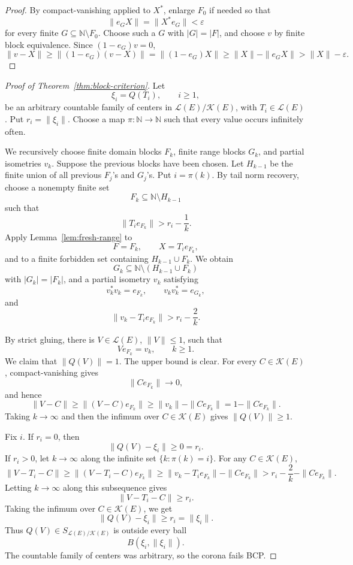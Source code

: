 \documentclass[11pt]{article}
\newcommand{\Lcal}{\mathcal L}
\newcommand{\Kcal}{\mathcal K}
\newcommand{\N}{\mathbb N}
\begin{document}
\begin{proof}
By compact-vanishing applied to \(X^*\), enlarge \(F_0\) if needed so that
\[
        \|e_G X\|=\|X^*e_G\|<\varepsilon
\]
for every finite \(G\subseteq\N\setminus F_0\).  Choose such a \(G\) with
\(|G|=|F|\), and choose \(v\) by finite block equivalence.  Since
\((1-e_G)v=0\),
\[
        \|v-X\|
        \ge \|(1-e_G)(v-X)\|
        =
        \|(1-e_G)X\|
        \ge \|X\|-\|e_GX\|
        >
        \|X\|-\varepsilon.
\]
\end{proof}

\begin{proof}[Proof of Theorem~\ref{thm:block-criterion}]
Let
\[
        \xi_i=Q(T_i),\qquad i\ge1,
\]
be an arbitrary countable family of centers in \(\Lcal(E)/\Kcal(E)\), with
\(T_i\in\Lcal(E)\).  Put \(r_i=\|\xi_i\|\).  Choose a map
\(\pi:\N\to\N\) such that every value occurs infinitely often.

We recursively choose finite domain blocks \(F_k\), finite range blocks
\(G_k\), and partial isometries \(v_k\).  Suppose the previous blocks have
been chosen.  Let \(H_{k-1}\) be the finite union of all previous \(F_j\)'s and
\(G_j\)'s.  Put \(i=\pi(k)\).  By tail norm recovery, choose a nonempty finite
set
\[
        F_k\subseteq\N\setminus H_{k-1}
\]
such that
\[
        \|T_i e_{F_k}\|>r_i-\frac1k.
\]
Apply Lemma~\ref{lem:fresh-range} to
\[
        F=F_k,\qquad X=T_i e_{F_k},
\]
and to a finite forbidden set containing \(H_{k-1}\cup F_k\).  We obtain
\[
        G_k\subseteq \N\setminus(H_{k-1}\cup F_k)
\]
with \(|G_k|=|F_k|\), and a partial isometry \(v_k\) satisfying
\[
        v_k^*v_k=e_{F_k},\qquad v_kv_k^*=e_{G_k},
\]
and
\[
        \|v_k-T_i e_{F_k}\|>r_i-\frac2k.
\]

By strict gluing, there is \(V\in\Lcal(E)\), \(\|V\|\le1\), such that
\[
        V e_{F_k}=v_k,\qquad k\ge1.
\]
We claim that \(\|Q(V)\|=1\).  The upper bound is clear.  For every
\(C\in\Kcal(E)\), compact-vanishing gives
\[
        \|C e_{F_k}\|\longrightarrow0,
\]
and hence
\[
        \|V-C\|
        \ge
        \|(V-C)e_{F_k}\|
        \ge
        \|v_k\|-\|C e_{F_k}\|
        =
        1-\|C e_{F_k}\|.
\]
Taking \(k\to\infty\) and then the infimum over \(C\in\Kcal(E)\) gives
\(\|Q(V)\|\ge1\).

Fix \(i\).  If \(r_i=0\), then
\[
        \|Q(V)-\xi_i\|\ge0=r_i.
\]
If \(r_i>0\), let \(k\to\infty\) along the infinite set
\(\{k:\pi(k)=i\}\).  For any \(C\in\Kcal(E)\),
\[
        \|V-T_i-C\|
        \ge
        \|(V-T_i-C)e_{F_k}\|
        \ge
        \|v_k-T_i e_{F_k}\|-\|C e_{F_k}\|
        >
        r_i-\frac2k-\|C e_{F_k}\|.
\]
Letting \(k\to\infty\) along this subsequence gives
\[
        \|V-T_i-C\|\ge r_i.
\]
Taking the infimum over \(C\in\Kcal(E)\), we get
\[
        \|Q(V)-\xi_i\|\ge r_i=\|\xi_i\|.
\]
Thus \(Q(V)\in S_{\Lcal(E)/\Kcal(E)}\) is outside every ball
\[
        B(\xi_i,\|\xi_i\|).
\]
The countable family of centers was arbitrary, so the corona fails BCP.
\end{proof}
\end{document}
